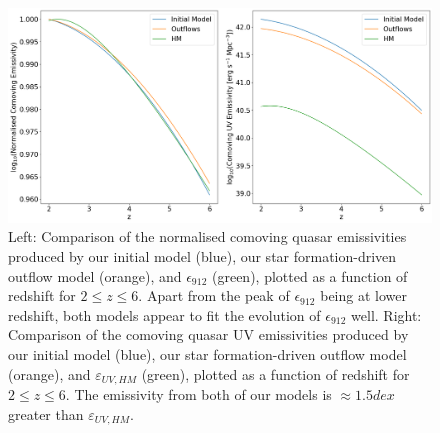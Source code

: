 \documentclass[12pt, twocolumn]{report}%
\begin{document}
\begin{figure}[H]
\centering
\includegraphics[width=\linewidth]{Comparison.png}
\caption{Left: Comparison of the normalised comoving quasar emissivities produced by our initial model (blue), our star formation-driven outflow model (orange), and $\epsilon_{912}$ (green), plotted as a function of redshift for $2\leq z\leq6$. Apart from the peak of $\epsilon_{912}$ being at lower redshift, both models appear to fit the evolution of $\epsilon_{912}$ well. Right: Comparison of the comoving quasar UV emissivities produced by our initial model (blue), our star formation-driven outflow model (orange), and $\varepsilon_{UV,HM}$ (green), plotted as a function of redshift for $2\leq z\leq6$. The emissivity from both of our models is $\approx1.5dex$ greater than $\varepsilon_{UV,HM}$.}
\label{fig:15}
\end{figure}

\twocolumngrid







\end{document}
